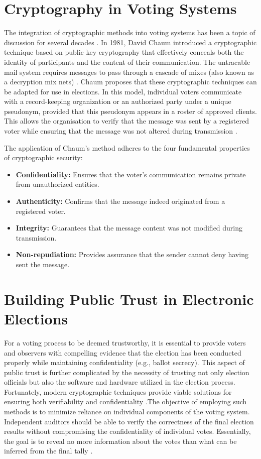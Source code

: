 \section{Cryptography in Voting Systems}
The integration of cryptographic methods into voting systems has been a topic of discussion for several decades \cite[6]{stuve-study}. In 1981, David Chaum introduced a cryptographic technique based on public key cryptography that effectively conceals both the identity of participants and the content of their communication. The untracable mail system requires messages to pass through a cascade of mixes (also known as a decryption mix nets) \cite[86]{chaum} \cite[84]{stuve-study}. Chaum proposes that these cryptographic techniques can be adapted for use in elections. In this model, individual voters communicate with a record-keeping organization or an authorized party under a unique pseudonym, provided that this pseudonym appears in a roster of approved clients. This allows the organisation to verify that the message was sent by a registered voter while ensuring that the message was not altered during transmission \cite[84]{chaum}.

The application of Chaum's method adheres to the four fundamental properties of cryptographic security:
\begin{itemize}
    \item \textbf{Confidentiality:} Ensures that the voter’s communication remains private from unauthorized entities.
    \item \textbf{Authenticity:} Confirms that the message indeed originated from a registered voter.
    \item \textbf{Integrity:} Guarantees that the message content was not modified during transmission.
    \item \textbf{Non-repudiation:} Provides assurance that the sender cannot deny having sent the message.
\end{itemize}

\section{Building Public Trust in Electronic Elections}
For a voting process to be deemed trustworthy, it is essential to provide voters and observers with compelling evidence that the election has been conducted properly while maintaining confidentiality (e.g., ballot secrecy). This aspect of public trust is further complicated by the necessity of trusting not only election officials but also the software and hardware utilized in the election process. Fortunately, modern cryptographic techniques provide viable solutions for ensuring both verifiability and confidentiality \cite[6]{stuve-study}.The objective of employing such methods is to minimize reliance on individual components of the voting system. Independent auditors should be able to verify the correctness of the final election results without compromising the confidentiality of individual votes. Essentially, the goal is to reveal no more information about the votes than what can be inferred from the final tally \cite[6, 10]{stuve-study}.


